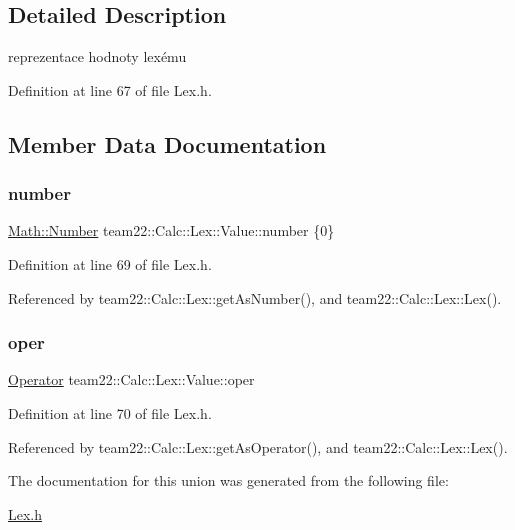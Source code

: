 \subsection{Detailed Description}
reprezentace hodnoty lexému 

Definition at line 67 of file Lex.\+h.



\subsection{Member Data Documentation}
\mbox{\label{unionteam22_1_1_calc_1_1_lex_1_1_value_a86e2e3ea0c887ca50885bcdb8f1ec5ce}} 
\subsubsection{\texorpdfstring{number}{number}}
{\footnotesize\ttfamily \hyperlink{classteam22_1_1_math_1_1_number}{Math\+::\+Number} team22\+::\+Calc\+::\+Lex\+::\+Value\+::number \{0\}}



Definition at line 69 of file Lex.\+h.



Referenced by team22\+::\+Calc\+::\+Lex\+::get\+As\+Number(), and team22\+::\+Calc\+::\+Lex\+::\+Lex().

\mbox{\label{unionteam22_1_1_calc_1_1_lex_1_1_value_ade46fa860d495ce4d431d3934210579d}} 
\subsubsection{\texorpdfstring{oper}{oper}}
{\footnotesize\ttfamily \hyperlink{classteam22_1_1_calc_1_1_lex_a61d29fc4878a3b36d2de2f13c56ed932}{Operator} team22\+::\+Calc\+::\+Lex\+::\+Value\+::oper}



Definition at line 70 of file Lex.\+h.



Referenced by team22\+::\+Calc\+::\+Lex\+::get\+As\+Operator(), and team22\+::\+Calc\+::\+Lex\+::\+Lex().



The documentation for this union was generated from the following file\+:\begin{DoxyCompactItemize}
\item 
\hyperlink{_lex_8h}{Lex.\+h}\end{DoxyCompactItemize}
